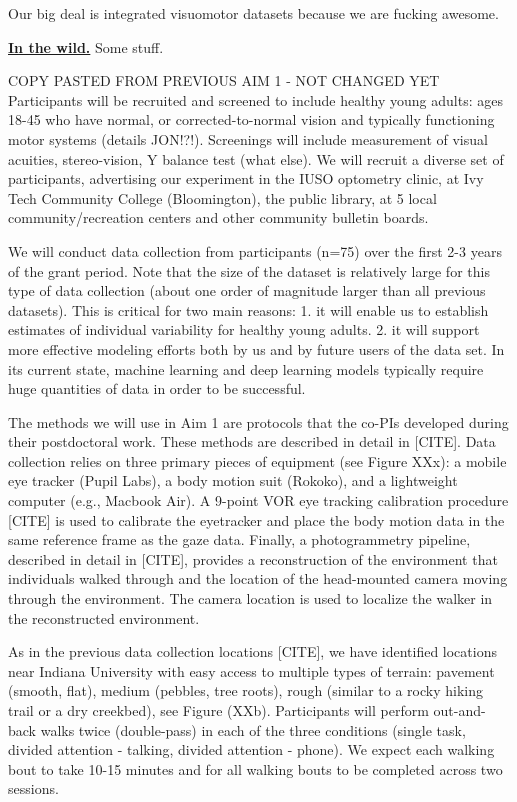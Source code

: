 Our big deal is integrated visuomotor datasets because we are fucking awesome.

\noindent \textbf{\underline{In the wild.}} Some stuff.

COPY PASTED FROM PREVIOUS AIM 1 - NOT CHANGED YET
Participants will be recruited and screened to include healthy young adults: ages 18-45 who have normal, or corrected-to-normal vision and typically functioning motor systems (details JON!?!). Screenings will include measurement of visual acuities, stereo-vision, Y balance test (what else). We will recruit a diverse set of participants, advertising our experiment in the IUSO optometry clinic, at Ivy Tech Community College (Bloomington), the public library, at 5 local community/recreation centers and other community bulletin boards.

We will conduct data collection from participants (n=75) over the first 2-3 years of the grant period. Note that the size of the dataset is relatively large for this type of data collection (about one order of magnitude larger than all previous datasets).  This is critical for two main reasons: 1. it will enable us to establish estimates of individual variability for healthy young adults.  2. it will support more effective modeling efforts both by us and by future users of the data set.  In its current state, machine learning and deep learning models typically require huge quantities of data in order to be successful.

The methods we will use in Aim 1 are protocols that the co-PIs developed during their postdoctoral work. These methods are described in detail in [CITE]. Data collection relies on three primary pieces of equipment (see Figure XXx): a mobile eye tracker (Pupil Labs), a body motion suit (Rokoko), and a lightweight computer (e.g., Macbook Air). A 9-point VOR eye tracking calibration procedure [CITE] is used to calibrate the eyetracker and place the body motion data in the same reference frame as the gaze data. Finally, a photogrammetry pipeline, described in detail in [CITE], provides a reconstruction of the environment that individuals walked through and the location of the head-mounted camera moving through the environment. The camera location is used to localize the walker in the reconstructed environment.

As in the previous data collection locations [CITE], we have
identified locations near Indiana University with easy access to
multiple types of terrain: pavement (smooth, flat), medium (pebbles, tree roots), rough (similar to a rocky hiking trail or a dry creekbed), see Figure (XXb). Participants will perform out-and-back walks twice (double-pass) in each of the three conditions (single task, divided attention - talking, divided attention - phone). We expect each walking bout to take 10-15 minutes and for all walking bouts to be completed across two sessions.

